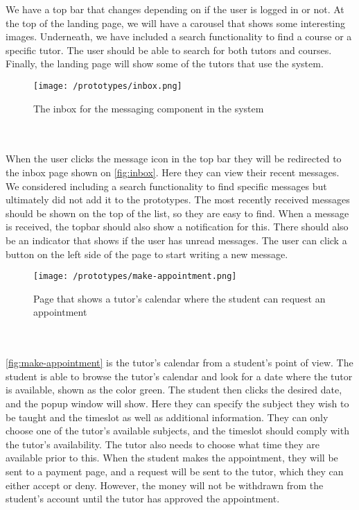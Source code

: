 We have a top bar that changes depending on if the user is logged in or not. 
At the top of the landing page, we will have a carousel that shows some interesting images.
Underneath, we have included a search functionality to find a course or a specific tutor. 
The user should be able to search for both tutors and courses. 
Finally, the landing page will show some of the tutors that use the system.
 \begin{figure}[]
    \texttt{[image: /prototypes/inbox.png]}
     \caption{The inbox for the messaging component in the system}
     \label{fig:inbox}
 \end{figure}
 \noindent
 \\\\
When the user clicks the message icon in the top bar they will be redirected to the inbox page shown on \autoref{fig:inbox}.
Here they can view their recent messages. 
We considered including a search functionality to find specific messages but ultimately did not add it to the prototypes. 
The most recently received messages should be shown on the top of the list, so they are easy to find. 
When a message is received, the topbar should also show a notification for this. 
There should also be an indicator that shows if the user has unread messages. 
The user can click a button on the left side of the page to start writing a new message. 
 \begin{figure}[]
    \centering
    \texttt{[image: /prototypes/make-appointment.png]}
     \caption{Page that shows a tutor's calendar where the student can request an appointment}
     \label{fig:make-appointment}
 \end{figure}
 \noindent
\\\\
 \autoref{fig:make-appointment} is the tutor's calendar from a student's point of view. 
 The student is able to browse the tutor's calendar and look for a date where the tutor is available, shown as the color green. 
 The student then clicks the desired date, and the popup window will show. 
 Here they can specify the subject they wish to be taught and the timeslot as well as additional information. 
 They can only choose one of the tutor's available subjects, and the timeslot should comply with the tutor's availability. 
 The tutor also needs to choose what time they are available prior to this.
 When the student makes the appointment, they will be sent to a payment page, and a request will be sent to the tutor, which they can either accept or deny.
 However, the money will not be withdrawn from the student's account until the tutor has approved the appointment.
